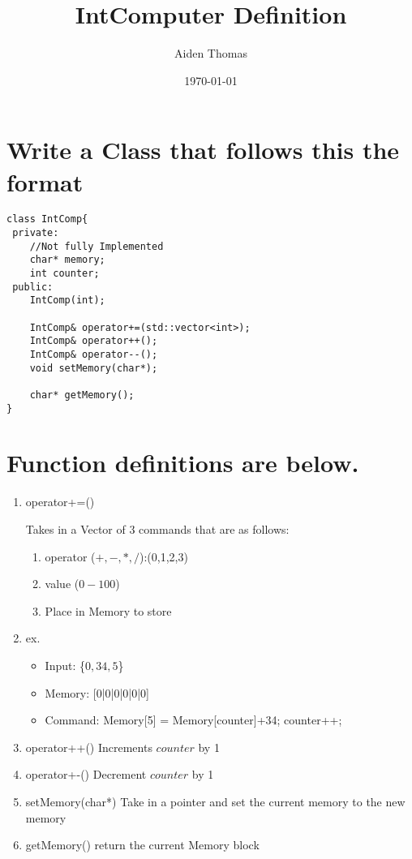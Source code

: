 \documentclass[11pt]{article}
\author{Aiden Thomas}
\date{\today}
\title{IntComputer Definition}
\begin{document}
\maketitle
\tableofcontents

\section{Write a Class that follows this the format}
\label{sec:org1c47e8c}
\begin{verbatim}
class IntComp{
 private:
    //Not fully Implemented
    char* memory;
    int counter;
 public:
    IntComp(int);

    IntComp& operator+=(std::vector<int>);
    IntComp& operator++();
    IntComp& operator--();
    void setMemory(char*);

    char* getMemory();
}
\end{verbatim}
\section{Function definitions are below.}
\label{sec:org91b76d9}
\begin{enumerate}
\item operator+=()

Takes in a Vector of \(3\) commands that are as follows:
\begin{enumerate}
\item operator (\(+,-,*,/\)):(0,1,2,3)
\item value (\(0-100\))
\item Place in Memory to store
\end{enumerate}

\item ex.
\begin{itemize}
\item Input: \{\(0, 34, 5\)\}
\item Memory: [0|0|0|0|0|0]
\item Command: Memory[5] = Memory[counter]+34; counter++;
\end{itemize}

\item operator++()
Increments \(counter\) by 1

\item operator+-()
Decrement \(counter\) by 1

\item setMemory(char*)
Take in a pointer and set the current memory to the new memory

\item getMemory()
return the current Memory block
\end{enumerate}
\end{document}

